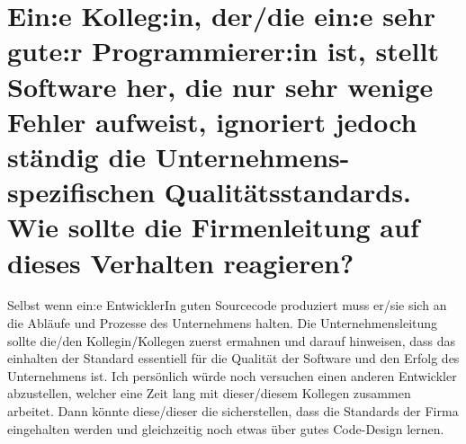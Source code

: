\documentclass[12pt]{article}
\begin{document}
\section{Ein:e Kolleg:in, der/die ein:e sehr gute:r Programmierer:in ist, stellt Software her, die nur sehr wenige Fehler aufweist, ignoriert jedoch ständig die Unternehmens- spezifischen Qualitätsstandards. Wie sollte die Firmenleitung auf dieses Verhalten reagieren?}
Selbst wenn ein:e EntwicklerIn guten Sourcecode produziert muss er/sie sich an die Abläufe und Prozesse des Unternehmens halten. Die Unternehmensleitung sollte die/den Kollegin/Kollegen zuerst ermahnen und darauf hinweisen, dass das einhalten der Standard essentiell für die Qualität der Software und den Erfolg des Unternehmens ist. Ich persönlich würde noch versuchen einen anderen Entwickler abzustellen, welcher eine Zeit lang mit dieser/diesem Kollegen zusammen arbeitet. Dann könnte diese/dieser die sicherstellen, dass die Standards der Firma eingehalten werden und gleichzeitig noch etwas über gutes Code-Design lernen.
\end{document}
